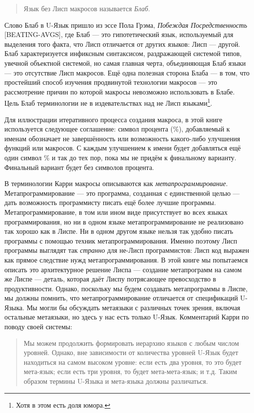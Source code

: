 \begin{quote}
Язык без Лисп макросов называется \emph{Блаб}.
\end{quote}

Слово Блаб в U-Язык пришло из эссе Пола Грэма, \emph{Побеждая Посредственность} [BEATING-AVGS], где Блаб --- это гипотетический язык, используемый для выделения того факта, что Лисп отличается от других языков: Лисп --- другой. Блаб характеризуется инфиксным синтаксисом, раздражающей системой типов, увечной объектной системой, но самая главная черта, объединяющая Блаб языки --- это отсутствие Лисп макросов. Ещё одна полезная сторона Блаба --- в том, что простейший способ изучения продвинутой технологии макросов --- это рассмотрение причин по которой макросы невозможно использовать в Блабе. Цель Блаб терминологии не в издевательствах над не Лисп языками\footnote{Хотя в этом есть доля юмора.}.

Для иллюстрации итеративного процесса создания макроса, в этой книге используется следующее соглашение: символ процента (\%), добавляемый к именам обозначает не завершённость или возможность какого-либо улучшения функций или макросов. С каждым улучшением к имени будет добавляться ещё один символ \% и так до тех пор, пока мы не придём к финальному варианту. Финальный вариант будет без символов процента.

В терминологии Карри макросы описываются как \emph{метапрограммирование}. Метапрограммирование --- это программа, созданная с единственной целью --- дать возможность программисту писать ещё более лучшие программы. Метапрограммирование, в том или ином виде присутствует во всех языках программирования, но ни в одном языке метапрограммирование не реализовано так хорошо как в Лиспе. Ни в одном другом языке нельзя так удобно писать программы с помощью техник метапрограммирования. Именно поэтому Лисп программы выглядят так \emph{странно} для не-Лисп программистов: Лисп код выражен как прямое следствие нужд метапрограммирования. В этой книге мы попытаемся описать это архитектурное решение Лиспа --- создание метапрограмм на самом же Лиспе --- деталь, которая даёт Лиспу потрясающее превосходство в продуктивности. Однако, поскольку мы будем создавать метапрограммы в Лиспе, мы должны помнить, что метапрограммирование отличается от спецификаций U-Языка. Мы могли бы обсуждать метаязыки с различных точек зрения, включая остальные метаязыки, но здесь у нас есть только U-Язык. Комментарий Карри по поводу своей системы:

\begin{quote}
Мы можем продолжить формировать иерархию языков с любым числом уровней. Однако, вне зависимости от количества уровней U-Язык будет находиться на самом высоком уровне: если есть два уровня, то это будет мета-язык; если есть три уровня, то будет мета-мета-язык; и т.д. Таким образом термины U-Языка и мета-языка должны различаться.
\end{quote}



